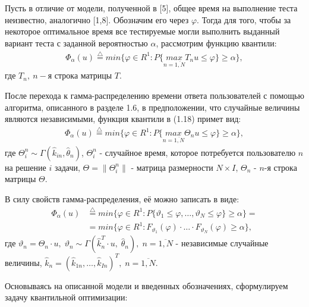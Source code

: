 \documentclass[14pt, a4paper]{extarticle}
\numberwithin{equation}{section}
\begin{document}
{Пусть в отличие от модели, полученной в [5], общее время на выполнение теста неизвестно, аналогично [1,8]. Обозначим его через $\varphi$. Тогда для того, чтобы за некоторое оптимальное время все тестируемые могли выполнить выданный вариант теста с заданной вероятностью $\alpha$, рассмотрим функцию квантили:
\begin{gather}
\Phi_\alpha (u) {\overset{\triangle}{=}} min\{\varphi \in R^1: P\{\underset{n=\overline{1,N}}{\overset{}{max}} T_n u\leqslant\varphi\}\geqslant\alpha\},
\end{gather}
где $ T_n,\: n-$я строка матрицы $T$.

После перехода к гамма-распределению времени ответа пользователей с помощью алгоритма, описанного в разделе 1.6, в предположении, что случайные величины являются независимыми, функция квантили в (1.18) примет вид:
\begin{gather}
\Phi_\alpha (u) {\overset{\triangle}{=}} min\{\varphi \in R^1: P\{\underset{n=\overline{1,N}}{\overset{}{max}} \Theta_n u\leqslant\varphi\}\geqslant\alpha\},
\end{gather}
где $\Theta_i^n \sim \Gamma(\hat{k}_{in},\hat{\theta}_n)$, $\Theta^n_i$ - случайное время, которое потребуется пользователю $n$ на решение $i$ задачи, $ \Theta = \parallel \Theta^n_i\parallel$ - матрица размерности $N \times I$,  $ \Theta_n$ - $n$-я строка матрицы $\Theta$.

В силу свойств гамма-распределения, её можно записать в виде:
\begin{equation}
    \begin{split}
        \Phi_\alpha (u) &{\overset{\triangle}{=}} min\{\varphi \in R^1: P\{\vartheta_1\leqslant\varphi,\ldots,\vartheta_N\leqslant\varphi\}\geqslant\alpha\} =\\
        &= min\{\varphi \in R^1: F_{\vartheta_1}(\varphi)\cdot\ldots\cdot F_{\vartheta_N}(\varphi)\geqslant\alpha\},
    \end{split}
\end{equation}
где $\vartheta_n=\Theta_n\cdot u,\; \vartheta_n\sim\Gamma(\hat{k}_n^T\cdot u,\; \hat{\theta}_n), \; n=\overline{1,N}$ - независимые случайные величины, $\hat{k}_n=(\hat{k}_{1n}, \ldots, \hat{k}_{In})^T,\; n=\overline{1,N}.$

Основываясь на описанной модели и введенных обозначениях, сформулируем задачу квантильной оптимизации:

}
\end{document}
